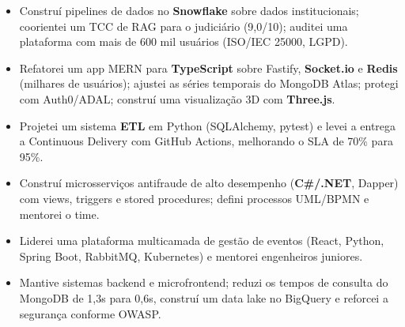 \documentclass[10pt,a4paper]{altacv}
\begin{document}
\begin{itemize}
\item Construí pipelines de dados no \textbf{Snowflake} sobre dados institucionais; coorientei um TCC de RAG para o judiciário (9,0/10); auditei uma plataforma com mais de 600 mil usuários (ISO/IEC 25000, LGPD).
\end{itemize}
\divider

\begin{itemize}
\item Refatorei um app MERN para \textbf{TypeScript} sobre Fastify, \textbf{Socket.io} e \textbf{Redis} (milhares de usuários); ajustei as séries temporais do MongoDB Atlas; protegi com Auth0/ADAL; construí uma visualização 3D com \textbf{Three.js}.
\end{itemize}
\divider

\begin{itemize}
\item Projetei um sistema \textbf{ETL} em Python (SQLAlchemy, pytest) e levei a entrega a Continuous Delivery com GitHub Actions, melhorando o SLA de 70\% para 95\%.
\end{itemize}
\divider

\begin{itemize}
\item Construí microsserviços antifraude de alto desempenho (\textbf{C\#/.NET}, Dapper) com views, triggers e stored procedures; defini processos UML/BPMN e mentorei o time.
\end{itemize}
\divider

\begin{itemize}
\item Liderei uma plataforma multicamada de gestão de eventos (React, Python, Spring Boot, RabbitMQ, Kubernetes) e mentorei engenheiros juniores.
\end{itemize}
\divider

\begin{itemize}
\item Mantive sistemas backend e microfrontend; reduzi os tempos de consulta do MongoDB de 1,3s para 0,6s, construí um data lake no BigQuery e reforcei a segurança conforme OWASP.
\end{itemize}
\divider
\end{document}
